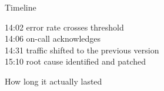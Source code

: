 \begin{frame}{Timeline}
  \begin{console}
  14:02  error rate crosses threshold\\
  14:06  on-call acknowledges\\
  14:31  traffic shifted to the previous version\\
  15:10  root cause identified and patched
  \end{console}
\end{frame}

\begin{frame}{How long it actually lasted}
\end{frame}
